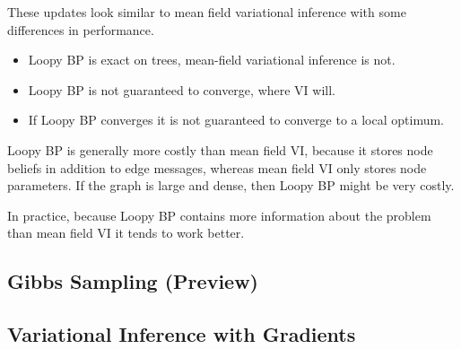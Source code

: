 \documentclass{article}
\begin{document}
These updates look similar to mean field variational inference with some differences in performance.
\begin{itemize}
	\item Loopy BP is exact on trees, mean-field variational inference is not.
	\item Loopy BP is not guaranteed to converge, where VI will.
	\item If Loopy BP converges it is not guaranteed to converge to a local optimum.
\end{itemize}
Loopy BP is generally more costly than mean field VI, because it stores node beliefs in addition to edge messages, whereas mean field VI only stores node parameters. If the graph is large and dense, then Loopy BP might be very costly. 

In practice, because Loopy BP contains more information about the problem than mean field VI it tends to work better.

\subsection{Gibbs Sampling (Preview)}
\subsection{Variational Inference with Gradients}
\end{document}
